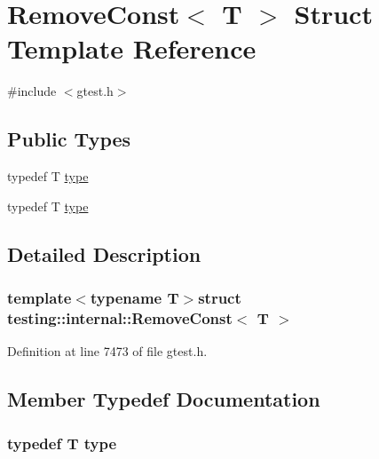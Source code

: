 \hypertarget{structtesting_1_1internal_1_1RemoveConst}{\section{\-Remove\-Const$<$ \-T $>$ \-Struct \-Template \-Reference}
\label{de/d54/structtesting_1_1internal_1_1RemoveConst}
}


{\ttfamily \#include $<$gtest.\-h$>$}

\subsection*{\-Public \-Types}
\begin{DoxyCompactItemize}
\item 
typedef \-T \hyperlink{structtesting_1_1internal_1_1RemoveConst_a565429e62c1d4fd084335146ba778e17}{type}
\item 
typedef \-T \hyperlink{structtesting_1_1internal_1_1RemoveConst_a565429e62c1d4fd084335146ba778e17}{type}
\end{DoxyCompactItemize}


\subsection{\-Detailed \-Description}
\subsubsection*{template$<$typename \-T$>$struct testing\-::internal\-::\-Remove\-Const$<$ T $>$}



\-Definition at line 7473 of file gtest.\-h.



\subsection{\-Member \-Typedef \-Documentation}
\hypertarget{structtesting_1_1internal_1_1RemoveConst_a565429e62c1d4fd084335146ba778e17}{
\subsubsection[{type}]{\setlength{\rightskip}{0pt plus 5cm}typedef \-T {\bf type}}}\label{de/d54/structtesting_1_1internal_1_1RemoveConst_a565429e62c1d4fd084335146ba778e17}


